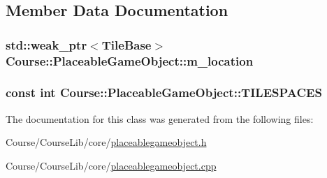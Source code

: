 \subsection{Member Data Documentation}
\hypertarget{classCourse_1_1PlaceableGameObject_a2c59e31d488edddd6cb41e5b39a01456}{
\subsubsection[{m\-\_\-location}]{\setlength{\rightskip}{0pt plus 5cm}std\-::weak\-\_\-ptr$<${\bf Tile\-Base}$>$ Course\-::\-Placeable\-Game\-Object\-::m\-\_\-location\hspace{0.3cm}{\ttfamily [private]}}}\label{classCourse_1_1PlaceableGameObject_a2c59e31d488edddd6cb41e5b39a01456}
\hypertarget{classCourse_1_1PlaceableGameObject_a9f3a7d817d3f90754025fb7a46d7f70d}{
\subsubsection[{T\-I\-L\-E\-S\-P\-A\-C\-E\-S}]{\setlength{\rightskip}{0pt plus 5cm}const int Course\-::\-Placeable\-Game\-Object\-::\-T\-I\-L\-E\-S\-P\-A\-C\-E\-S}}\label{classCourse_1_1PlaceableGameObject_a9f3a7d817d3f90754025fb7a46d7f70d}


The documentation for this class was generated from the following files\-:\begin{DoxyCompactItemize}
\item 
Course/\-Course\-Lib/core/\hyperlink{placeablegameobject_8h}{placeablegameobject.\-h}\item 
Course/\-Course\-Lib/core/\hyperlink{placeablegameobject_8cpp}{placeablegameobject.\-cpp}\end{DoxyCompactItemize}
